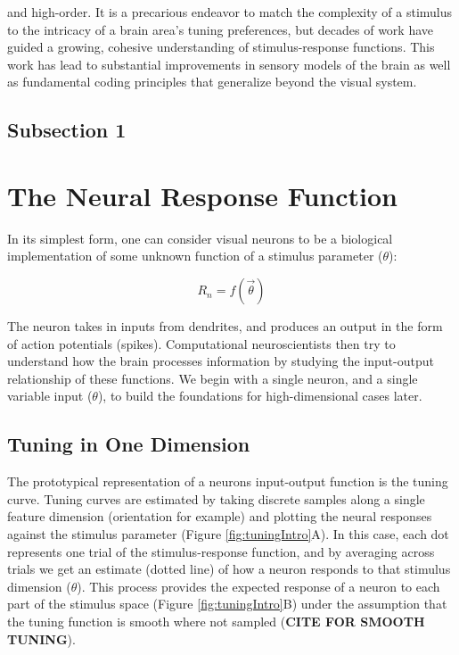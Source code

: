 and high-order. It is a precarious endeavor to match the complexity of a stimulus to the intricacy of a brain area's tuning preferences, but decades of work have guided a growing, cohesive understanding of stimulus-response functions. This work has lead to substantial improvements in sensory models of the brain as well as fundamental coding principles that generalize beyond the visual system.

\subsection{Subsection 1}




\section{The Neural Response Function}
In its simplest form, one can consider visual neurons to be a biological implementation of some unknown function of a stimulus parameter ($\theta$):

\begin{equation}
R_n = f(\vec{\theta})
\end{equation}


The neuron takes in inputs from dendrites, and produces an output in the form of action potentials (spikes). Computational neuroscientists then try to understand how the brain processes information by studying the input-output relationship of these functions. We begin with a single neuron, and a single variable input ($\theta$), to build the foundations for high-dimensional cases later.

\subsection{Tuning in One Dimension}

The prototypical representation of a neurons input-output function is the tuning curve. Tuning curves are estimated by taking discrete samples along a single feature dimension (orientation for example) and plotting the neural responses against the stimulus parameter (Figure \ref{fig:tuningIntro}A). In this case, each dot represents one trial of the stimulus-response function, and by averaging across trials we get an estimate (dotted line) of how a neuron responds to that stimulus dimension ($\theta$). This process provides the expected response of a neuron to each part of the stimulus space (Figure \ref{fig:tuningIntro}B) under the assumption that the tuning function is smooth where not sampled (\textbf{CITE FOR SMOOTH TUNING}). 
 
